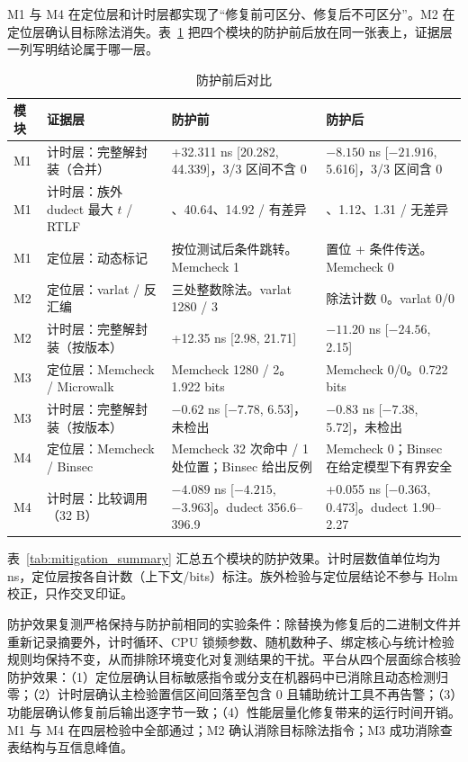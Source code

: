 M1 与 M4 在定位层和计时层都实现了“修复前可区分、修复后不可区分”。M2 在定位层确认目标除法消失。表~\ref{tab:beforeafter} 把四个模块的防护前后放在同一张表上，证据层一列写明结论属于哪一层。%

\begin{table}[H]
\centering
\caption{防护前后对比}
\label{tab:beforeafter}
{\small
\begin{tabularx}{\textwidth}{|>{\raggedright\arraybackslash}p{1.2cm}|>{\raggedright\arraybackslash}p{3.5cm}|>{\raggedright\arraybackslash}p{5.2cm}|>{\raggedright\arraybackslash}X|}
\hline
模块 & 证据层 & 防护前 & 防护后 \\
\hline
M1 & 计时层：完整解封装（合并） & +32.311 ns [20.282, 44.339]，3/3 区间不含 0 & $-8.150$ ns [$-21.916$, 5.616]，3/3 区间含 0 \\
\hline
M1 & 计时层：族外 dudect 最大 $t$ / RTLF & 26.41、40.64、14.92 / 有差异 & 1.15、1.12、1.31 / 无差异 \\
\hline
M1 & 定位层：动态标记 & 按位测试后条件跳转。Memcheck 1 & 置位 + 条件传送。Memcheck 0 \\
\hline
M2 & 定位层：varlat / 反汇编 & 三处整数除法。varlat 1280 / 3 & 除法计数 0。varlat 0/0 \\
\hline
M2 & 计时层：完整解封装（按版本） & +12.35 ns [2.98, 21.71] & $-11.20$ ns [$-24.56$, 2.15] \\
\hline
M3 & 定位层：Memcheck / Microwalk & Memcheck 1280 / 2。1.922 bits & Memcheck 0/0。0.722 bits \\
\hline
M3 & 计时层：完整解封装（按版本） & $-0.62$ ns [$-7.78$, 6.53]，未检出 & $-0.83$ ns [$-7.38$, 5.72]，未检出 \\
\hline
M4 & 定位层：Memcheck / Binsec & Memcheck 32 次命中 / 1 处位置；Binsec 给出反例 & Memcheck 0；Binsec 在给定模型下有界安全 \\
\hline
M4 & 计时层：比较调用（32 B） & $-4.089$ ns [$-4.215$, $-3.963$]。dudect 356.6--396.9 & +0.055 ns [$-0.363$, 0.473]。dudect 1.90--2.27 \\
\hline
\end{tabularx}
}
\end{table}

表~\ref{tab:mitigation_summary} 汇总五个模块的防护效果。计时层数值单位均为 ns，定位层按各自计数（上下文/bits）标注。族外检验与定位层结论不参与 Holm 校正，只作交叉印证。

防护效果复测严格保持与防护前相同的实验条件：除替换为修复后的二进制文件并重新记录摘要外，计时循环、CPU 锁频参数、随机数种子、绑定核心与统计检验规则均保持不变，从而排除环境变化对复测结果的干扰。平台从四个层面综合核验防护效果：（1）定位层确认目标敏感指令或分支在机器码中已消除且动态检测归零；（2）计时层确认主检验置信区间回落至包含 0 且辅助统计工具不再告警；（3）功能层确认修复前后输出逐字节一致；（4）性能层量化修复带来的运行时间开销。M1 与 M4 在四层检验中全部通过；M2 确认消除目标除法指令；M3 成功消除查表结构与互信息峰值。


